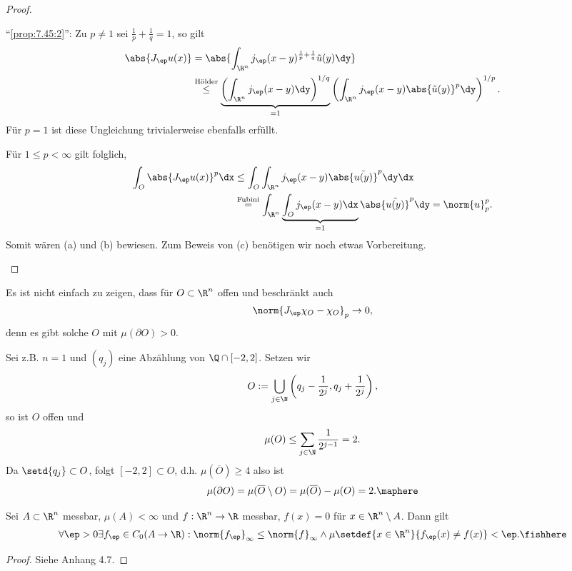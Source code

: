 \begin{proof}
\begin{proofenum}
``\ref{prop:7.45:2}'':
Zu $p\neq 1$ sei $\frac{1}{p}+\frac{1}{q}=1$, so gilt
\begin{align*}
\abs{J_\ep u(x)} &=
\abs{\int_{\R^n}j_\ep(x-y)^{\frac{1}{p}+\frac{1}{q}}\tilde{u}(y)\dy}\\
&\overset{\text{Hölder}}{\le}
\underbrace{\left(\int_{\R^n} j_\ep(x-y)\dy \right)^{1/q}}_{=1}
\left(\int_{\R^n}j_\ep(x-y)\abs{\tilde{u}(y)}^p\dy \right)^{1/p}.
\end{align*}
Für $p=1$ ist diese Ungleichung trivialerweise ebenfalls erfüllt.

Für $1\le p < \infty$ gilt folglich,
\begin{align*}
\int_{O} \abs{J_\ep u(x)}^p \dx
&\le 
\int_{O}\int_{\R^n} j_\ep(x-y)\abs{\tilde{u(y)}}^p\dy \dx\\
&\overset{\text{Fubini}}{=}
\int_{\R^n} \underbrace{\int_{O}j_\ep(x-y) \dx}_{=1} \abs{\tilde{u(y)}}^p
\dy = \norm{u}_p^p.
\end{align*}
Somit wären (a) und (b) bewiesen. Zum Beweis von (c) benötigen wir noch etwas
Vorbereitung.\qedhere
\end{proofenum}
\end{proof}

\begin{bem}
\label{bem:7.46}
Es ist nicht einfach zu zeigen, dass für $O\subset\R^n$ offen und beschränkt
auch
\begin{align*}
\norm{J_\ep \chi_O - \chi_O}_p \to 0,
\end{align*}
denn es gibt solche $O$ mit $\mu(\partial O) > 0$.

Sei z.B. $n=1$ und $(q_j)$ eine Abzählung von $\Q\cap[-2,2]$. Setzen wir
\begin{align*}
O := \bigcup_{j\in\N} \left(q_j-\frac{1}{2^j},q_j+\frac{1}{2^j}\right),
\end{align*}
so ist $O$ offen und
\begin{align*}
\mu(O) \le \sum_{j\in\N} \frac{1}{2^{j-1}} = 2.
\end{align*}
Da $\setd{q_j}\subset O$, folgt $[-2,2]\subset O$, d.h. $\mu(\overline{O}) \ge
4$ also ist
\begin{align*}
\mu(\partial O) = \mu(\overline{O}\setminus O) = \mu(\overline{O})-\mu(O) =
2.\maphere
\end{align*}
\end{bem}

\begin{prop}
\label{prop:7.45}
Sei $A\subset\R^n$ messbar, $\mu(A) < \infty$ und $f:\R^n\to\R$ messbar,
$f(x)=0$ für $x\in\R^n\setminus A$. Dann gilt
\begin{align*}
\forall \ep > 0 \exists f_\ep \in C_0(A\to\R) : \norm{f_\ep}_\infty
\le \norm{f}_\infty \land
\mu\setdef{x\in\R^n}{f_\ep(x)\neq f(x)}< \ep.\fishhere
\end{align*}
\end{prop}
\begin{proof}
Siehe \cite{Alt99} Anhang 4.7.\qedhere
\end{proof}

